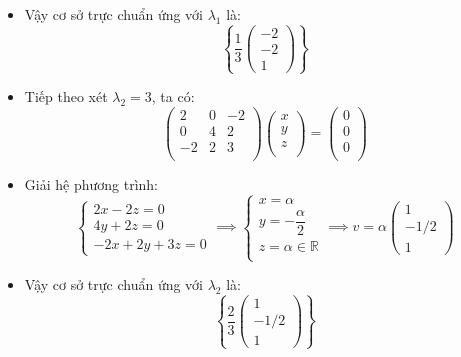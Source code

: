 \documentclass[a4paper, 12pt]{report}
\begin{document}
\begin{itemize}
    \item Vậy cơ sở trực chuẩn ứng với $\lambda_1$ là:
    $$
    \left\{
        \dfrac{1}{3}
    \begin{pmatrix}
        -2 \\
        -2 \\
        1 
    \end{pmatrix}
    \right\}
    $$

    \item Tiếp theo xét $\lambda_2 = 3$, ta có:
    $$
    \begin{pmatrix}
        2 & 0 & -2 \\ 
        0 & 4 & 2 \\
        -2 & 2 & 3 \\
    \end{pmatrix} 
    \begin{pmatrix}
        x \\
        y \\
        z \\
    \end{pmatrix} 
    = 
    \begin{pmatrix}
        0 \\
        0 \\
        0 \\
    \end{pmatrix}
    $$

    \item Giải hệ phương trình:
    $$
    \begin{cases}
        2x - 2z = 0 \\
        4y + 2z = 0 \\
        -2x + 2y + 3z = 0
    \end{cases} \implies
    \begin{cases}
        x = \alpha \\
        y = -\dfrac{\alpha}{2} \\
        z = \alpha \in \mathbb{R} \\
    \end{cases} \implies
    v = \alpha \begin{pmatrix}
        1 \\
        -1 / 2 \\
        1
    \end{pmatrix}
    $$

    \item Vậy cơ sở trực chuẩn ứng với $\lambda_2$ là:
    $$
    \left\{
        \dfrac{2}{3}
    \begin{pmatrix}
        1 \\
        -1 / 2 \\
        1
    \end{pmatrix}
    \right\}
    $$


\end{itemize}
\end{document}

